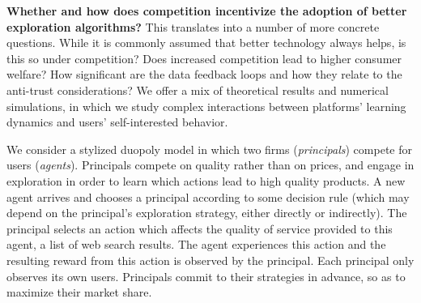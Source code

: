 \textbf{Whether and how does competition incentivize the adoption of better exploration algorithms?}
This translates into a number of more concrete questions. While it is commonly assumed that better technology always helps, is this so under competition? Does increased competition lead to higher consumer welfare? How significant are the data feedback loops
and how they relate to the anti-trust considerations?
We offer a mix of theoretical results and numerical simulations, in which we study complex interactions between platforms' learning dynamics and users' self-interested behavior.








 We consider a stylized duopoly model in which two firms (\emph{principals}) compete for users (\emph{agents}). Principals compete on quality rather than on prices, and engage in exploration in order to learn which actions lead to high quality products. A new agent arrives and chooses a principal according to some decision rule (which may depend on the principal's exploration strategy, either directly or indirectly). The principal selects an action which affects the quality of service provided to this agent, \eg a list of web search results. The agent experiences this action and the resulting reward from this action is observed by the principal. Each principal only observes its own users. Principals commit to their strategies in advance, so as to maximize their market share.


